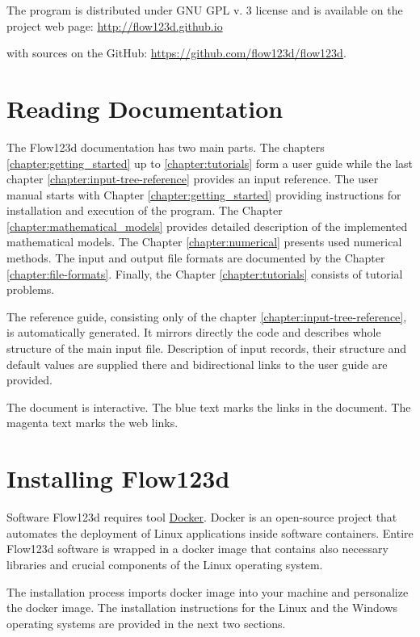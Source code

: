 \documentclass[12pt,a4paper]{report}
\begin{document}
The program is distributed under GNU GPL v. 3 license and is available on the project web page:
\url{http://flow123d.github.io}

with sources on the GitHub:
\url{https://github.com/flow123d/flow123d}.


\section{Reading Documentation}
The Flow123d documentation has two main parts. The chapters \ref{chapter:getting_started} up to \ref{chapter:tutorials} 
form a user guide while the last chapter \ref{chapter:input-tree-reference} provides an input reference.
The user manual starts with Chapter \ref{chapter:getting_started} providing instructions for installation and execution of the program.
The Chapter \ref{chapter:mathematical_models} provides detailed description of the implemented mathematical models.
The Chapter \ref{chapter:numerical} presents used numerical methods. The input and output file formats are documented by the Chapter 
\ref{chapter:file-formats}. Finally, the Chapter \ref{chapter:tutorials}  consists of tutorial problems.

The reference guide, consisting only of the chapter \ref{chapter:input-tree-reference}, is automatically
generated. It mirrors directly the code and describes whole structure of the main input file. Description
of input records, their structure and default values are supplied there and bidirectional links to the user 
guide are provided.

The document is interactive. The blue text marks the links in the document. The magenta text marks the web links.

\section{Installing Flow123d}
Software Flow123d requires tool \href{https://www.docker.com}{Docker}. 
Docker is an open-source project that automates the deployment of Linux applications inside software containers. 
Entire Flow123d software is wrapped in a docker image that contains also necessary libraries and crucial components 
of the Linux operating system.

The installation process imports docker image into your machine and personalize the docker image. The installation 
instructions for the Linux and the Windows operating systems are provided in the next two sections.
\end{document}
